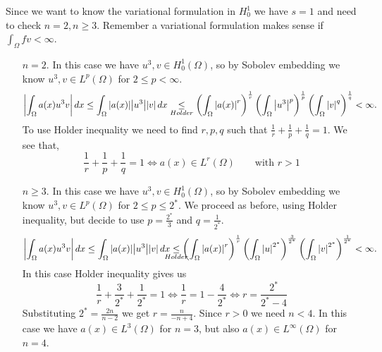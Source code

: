 Since we want to know the variational formulation in \(H^1_0\) we have \(s = 1\) and need to check \(n = 2, n \geq 3\). Remember a variational formulation makes sense if \(\int_\Omega fv < \infty\).
\begin{itemize}
    \item[\(n = 2\).] In this case we have \(u^3, v \in H^1_0(\Omega)\), so by Sobolev embedding we know \(u^3, v \in L^p(\Omega)\) for \(2 \leq p < \infty\). 
    \[
        \abs{\int_\Omega a(x) u^3 v}  \, dx \leq \int_\Omega \abs{a(x)} \abs{u^3} \abs{v} \, dx \underset{Holder}{\leq} \left(\int_\Omega \abs{a(x)}^r\right)^{\frac{1}{r}} \left(\int_\Omega \abs{u^3}^p \right)^{\frac{1}{p}} \left(\int_\Omega \abs{v}^q \right)^{\frac{1}{q}} < \infty.
    \]
    To use Holder inequality we need to find \(r, p, q\) such that \(\frac{1}{r} + \frac{1}{p} + \frac{1}{q} = 1\). We see that, 
    \[
        \frac{1}{r} + \frac{1}{p} + \frac{1}{q} = 1 \iff a(x) \in L^r(\Omega) \qquad \text{with } r > 1
    \]
    \item[\(n \geq 3\).] In this case we have \(u^3, v \in H^1_0(\Omega)\), so by Sobolev embedding we know \(u^3, v \in L^p(\Omega)\) for \(2 \leq p \leq 2^*\).
    We proceed as before, using Holder inequality, but decide to use \(p = \frac{2^*}{3}\) and \(q = \frac{1}{2^*}.\)
    \[
        \abs{\int_\Omega a(x) u^3 v}  \, dx \leq \int_\Omega \abs{a(x)} \abs{u^3} \abs{v} \, dx \underset{\mathclap{Holder}}{\leq} \left(\int_\Omega \abs{a(x)}^r\right)^{\frac{1}{r}} \left(\int_\Omega \abs{u}^{2^*} \right)^{\frac{3}{2^*}} \left(\int_\Omega \abs{v}^{2^*} \right)^{\frac{1}{2^*}} < \infty.
    \]
    In this case Holder inequality gives us 
    \[
        \frac{1}{r} + \frac{3}{2^*} + \frac{1}{2^*} = 1 \iff \frac{1}{r} = 1 - \frac{4}{2^*} \iff r = \frac{2^*}{2^* - 4}
    \]
    Substituting \(2^* = \frac{2n}{n - 2}\) we get \(r = \frac{n}{-n + 4}\). Since \(r > 0\) we need \(n < 4\).
    In this case we have \(a(x) \in L^3(\Omega)\) for \(n = 3\), but also \(a(x) \in L^\infty(\Omega)\) for \(n = 4\).
\end{itemize}

